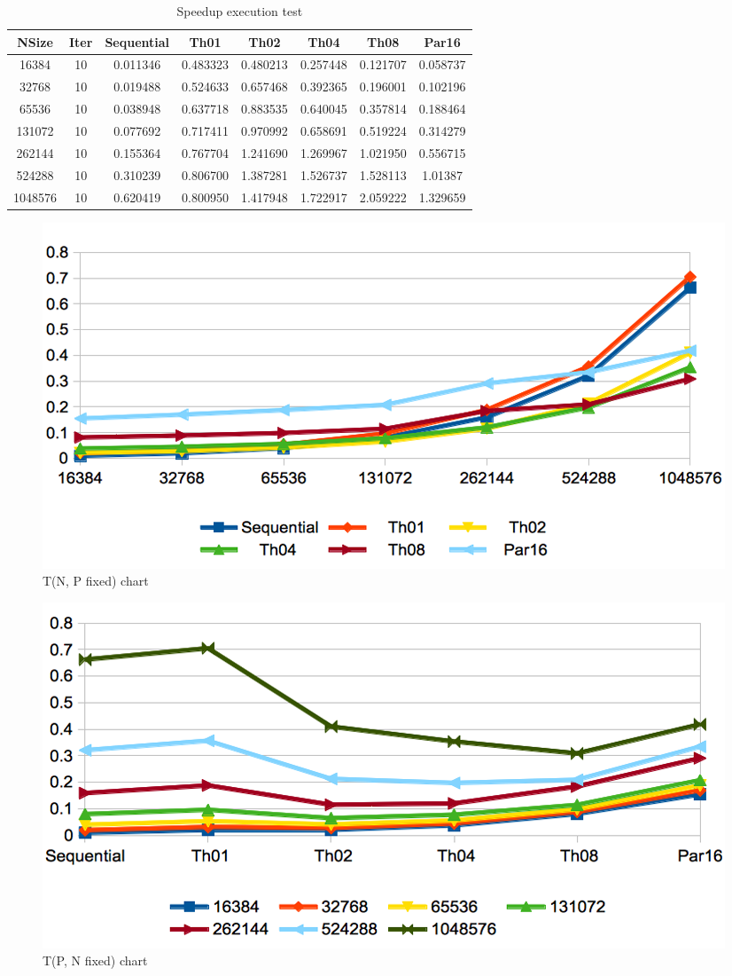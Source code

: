 \documentclass[a4paper,10pt,notitlepage]{article}
\begin{document}
\begin{table}[!htb]
  \centering
  \begin{tabular}{ | c | c | c | c | c | c | c | c | }
  \hline
 NSize & Iter & Sequential & Th01 & Th02 & Th04 & Th08 & Par16 \\ \hline  
16384 & 10 & 0.011346 & 0.483323 & 0.480213 & 0.257448 & 0.121707 & 0.058737 \\ \hline  
32768 & 10 & 0.019488 & 0.524633 & 0.657468 & 0.392365 & 0.196001 & 0.102196 \\ \hline  
65536 & 10 & 0.038948 & 0.637718 & 0.883535 & 0.640045 & 0.357814 & 0.188464 \\ \hline  
131072 & 10 & 0.077692 & 0.717411 & 0.970992 & 0.658691 & 0.519224 & 0.314279 \\ \hline  
262144 & 10 & 0.155364 & 0.767704 & 1.241690 & 1.269967 & 1.021950 & 0.556715 \\ \hline  
524288 & 10 & 0.310239 & 0.806700 & 1.387281 & 1.526737 & 1.528113 & 1.01387 \\ \hline  
1048576 & 10 & 0.620419 & 0.800950 & 1.417948 & 1.722917 & 2.059222 & 1.329659 \\ \hline  
  \end{tabular}
  \caption{Speedup execution test}
  \end{table}

\begin{figure}[!htb]
\centering
\includegraphics[scale=0.5]{1-tn.png}
\caption{T(N, P fixed) chart}
\label{fig:1-tn}
\end{figure}

\begin{figure}[!htb]
\centering
\includegraphics[scale=0.5]{1-tp.png}
\caption{T(P, N fixed) chart}
\label{fig:1-tp}
\end{figure}
\end{document}

